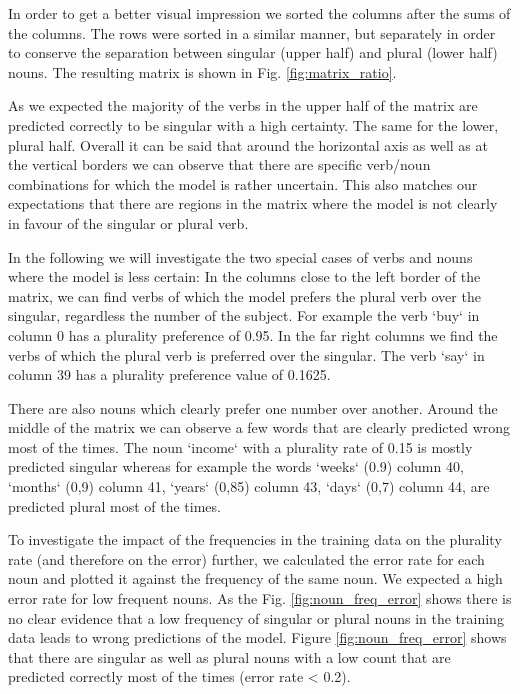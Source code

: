In order to get a better visual impression we sorted the columns after the sums of the columns. The rows were sorted in a similar manner, but separately in order to conserve the separation between singular (upper half) and plural (lower half) nouns. The resulting matrix is shown in Fig. \ref{fig:matrix_ratio}.

As we expected the majority of the verbs in the upper half of the matrix are predicted correctly to be singular with a high certainty. The same for the lower, plural half. Overall it can be said that around the horizontal axis as well as at the vertical borders we can observe that there are specific verb/noun combinations for which the model is rather uncertain. This also matches our expectations that there are regions in the matrix where the model is not clearly in favour of the singular or plural verb. 

In the following we will investigate the two special cases of verbs and nouns where the model is less certain: 
In the columns close to the left border of the matrix, we can find verbs of which the model prefers the plural verb over the singular, regardless the number of the subject. For example the verb `buy` in column 0 has a plurality preference of 0.95. In the far right columns we find the verbs of which the plural verb is preferred over the singular. The verb `say` in column 39 has a plurality preference value of 0.1625.

There are also nouns which clearly prefer one number over another. Around the middle of the matrix we can observe a few words that are clearly predicted wrong most of the times. The noun `income` with a plurality rate of 0.15 is mostly predicted singular whereas for example the words `weeks` (0.9) column 40, `months` (0,9) column 41, `years` (0,85) column 43, `days` (0,7) column 44, are predicted plural most of the times.

To investigate the impact of the frequencies in the training data on the plurality rate (and therefore on the error) further, we calculated the error rate for each noun and plotted it against the frequency of the same noun. We expected a high error rate for low frequent nouns. As the Fig. \ref{fig:noun_freq_error} shows there is no clear evidence that a low frequency of singular or plural nouns in the training data leads to wrong predictions of the model. Figure \ref{fig:noun_freq_error} shows that there are singular as well as plural nouns with a low count that are predicted correctly most of the times (error rate < 0.2). 

